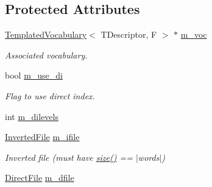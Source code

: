 \subsection*{Protected Attributes}
\begin{DoxyCompactItemize}
\item 
\mbox{\label{classDBoW2_1_1TemplatedDatabase_ab0c5f84016743f6829c80041cd54391d}} 
\hyperlink{classDBoW2_1_1TemplatedVocabulary}{Templated\+Vocabulary}$<$ T\+Descriptor, F $>$ $\ast$ \hyperlink{classDBoW2_1_1TemplatedDatabase_ab0c5f84016743f6829c80041cd54391d}{m\+\_\+voc}
\begin{DoxyCompactList}\small\item\em Associated vocabulary. \end{DoxyCompactList}\item 
\mbox{\label{classDBoW2_1_1TemplatedDatabase_a3131f1682a80fd704221eaa88e45d59f}} 
bool \hyperlink{classDBoW2_1_1TemplatedDatabase_a3131f1682a80fd704221eaa88e45d59f}{m\+\_\+use\+\_\+di}
\begin{DoxyCompactList}\small\item\em Flag to use direct index. \end{DoxyCompactList}\item 
int \hyperlink{classDBoW2_1_1TemplatedDatabase_a0cd32f1e5a9a0a6c61d976da754d507d}{m\+\_\+dilevels}
\item 
\mbox{\label{classDBoW2_1_1TemplatedDatabase_a27c2c9247ba8872a997c5dcf49ba4098}} 
\hyperlink{classDBoW2_1_1TemplatedDatabase_ad16f54a326cfb827de3af1d979c52768}{Inverted\+File} \hyperlink{classDBoW2_1_1TemplatedDatabase_a27c2c9247ba8872a997c5dcf49ba4098}{m\+\_\+ifile}
\begin{DoxyCompactList}\small\item\em Inverted file (must have \hyperlink{classDBoW2_1_1TemplatedDatabase_a5c30e54458f694aef1941a0dec193d4d}{size()} == $\vert$words$\vert$) \end{DoxyCompactList}\item 
\mbox{\label{classDBoW2_1_1TemplatedDatabase_a7c9d56812538121c9f6cf930eea54c1f}} 
\hyperlink{classDBoW2_1_1TemplatedDatabase_aa74effa19eeb016d54e256861938aac9}{Direct\+File} \hyperlink{classDBoW2_1_1TemplatedDatabase_a7c9d56812538121c9f6cf930eea54c1f}{m\+\_\+dfile}

\end{DoxyCompactItemize}

